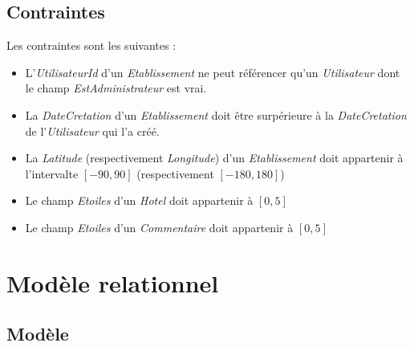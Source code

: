 \documentclass[10pt,a4paper]{article}
\begin{document}
\subsection{Contraintes}

Les contraintes sont les suivantes :
\begin{itemize}
  \item L'\textit{UtilisateurId} d'un \textit{Etablissement} ne peut référencer qu'un \textit{Utilisateur} dont le champ \textit{EstAdministrateur} est vrai.
  \item La \textit{DateCretation} d'un \textit{Etablissement} doit être surpérieure à la \textit{DateCretation} de l'\textit{Utilisateur} qui l'a créé.
  \item La \textit{Latitude} (respectivement \textit{Longitude}) d'un \textit{Etablissement} doit appartenir à l'intervalte $[-90, 90]$ (respectivement $[-180, 180]$)
  \item Le champ \textit{Etoiles} d'un \textit{Hotel} doit appartenir à $[0,5]$
  \item Le champ \textit{Etoiles} d'un \textit{Commentaire} doit appartenir à $[0,5]$

\end{itemize}




\section{Modèle relationnel}
\subsection{Modèle}
\end{document}
